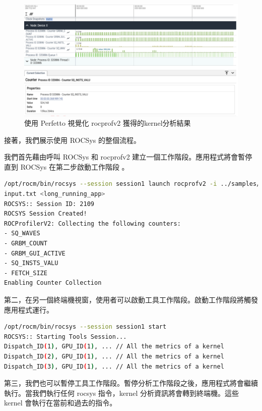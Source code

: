 \begin{figure}
    \centering
    \includegraphics[width=1\linewidth]{FileAusiliari/Screenshots/Figure7-6.png}
    \caption{使用 Perfetto 視覺化 rocprofv2 獲得的kernel分析結果}
    \label{fig:captured kernel profiling results}
\end{figure}

接著，我們展示使用 ROCSys 的整個流程。

我們首先藉由呼叫 ROCSys 和 rocprofv2 建立一個工作階段。應用程式將會暫停直到 ROCSys 在第二步啟動工作階段 。

\begin{lstlisting}[language=bash, caption={使用 ROCSys 和 rocprofv2 建立工作階段}, label={lst:Creating a session using ROCSys and rocprofv2}]
/opt/rocm/bin/rocsys --session session1 launch rocprofv2 -i ../samples/
input.txt <long_running_app>
ROCSYS:: Session ID: 2109
ROCSYS Session Created!
ROCProfilerV2: Collecting the following counters:
- SQ_WAVES
- GRBM_COUNT
- GRBM_GUI_ACTIVE
- SQ_INSTS_VALU
- FETCH_SIZE
Enabling Counter Collection
\end{lstlisting}

第二，在另一個終端機視窗，使用者可以啟動工具工作階段。啟動工作階段將觸發應用程式運行。

\begin{lstlisting}[language=bash, caption={開始分析工作階段}, label={lst:Starting the profiling session}]
/opt/rocm/bin/rocsys --session session1 start
ROCSYS:: Starting Tools Session...
Dispatch_ID(1), GPU_ID(1), ... // All the metrics of a kernel
Dispatch_ID(2), GPU_ID(1), ... // All the metrics of a kernel
Dispatch_ID(3), GPU_ID(1), ... // All the metrics of a kernel
\end{lstlisting}

第三，我們也可以暫停工具工作階段。暫停分析工作階段之後，應用程式將會繼續執行。當我們執行任何 rocsys 指令，kernel 分析資訊將會轉到終端機。這些 kernel 會執行在當前和過去的指令。

